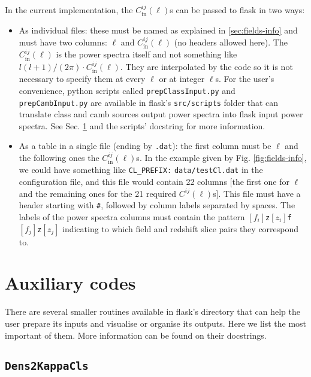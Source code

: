 \documentclass[12pt]{book} %
\newcommand{\nv}[1]{\mathrm{#1}}                 %
\begin{document}
In the current implementation, the $C_{\nv{in}}^{ij}(\ell)$s can be passed to {\sc flask} in two ways:
\begin{itemize}
\item As individual files: these must be named as explained in \ref{sec:fields-info} and must 
have two columns: $\ell$ and $C_{\nv{in}}^{ij}(\ell)$ (no headers allowed here). The $C_{\nv{in}}^{ij}(\ell)$ 
is the power spectra itself and not something like 
$l(l+1)/(2\pi)\cdot C_{\nv{in}}^{ij}(\ell)$. They are interpolated by the code so it is not necessary 
to specify them at every $\ell$ or at integer $\ell$s. For the user's convenience, {\sc python} 
scripts called {\tt prepClassInput.py} and {\tt prepCambInput.py} are available in {\sc flask}'s 
{\tt src/scripts} folder that can translate {\sc class} and {\sc camb sources} output power spectra 
into {\sc flask} input power spectra. See Sec. \ref{sec:aux} and the scripts' docstring for more information. 

\item As a table in a single file (ending by {\tt .dat}): the first column must be $\ell$ 
and the following ones the  $C_{\nv{in}}^{ij}(\ell)$s. In the example given by 
Fig. \ref{fig:fields-info}, we could have something like {\tt CL\_PREFIX:} 
{\tt data/testCl.dat} in the configuration file, and this file would contain 
22 columns [the first one for $\ell$ and the remaining ones for the 21 required 
$C^{ij}(\ell)$s]. This file must have a header starting with {\tt \#}, followed 
by column labels separated by spaces. The labels of the power spectra columns must 
contain the pattern $[f_i]${\tt z}$[z_i]${\tt f}$[f_j]${\tt z}$[z_j]$ indicating 
to which field and redshift slice pairs they correspond to.
\end{itemize}

\section{Auxiliary codes}
\label{sec:aux} 

There are several smaller routines available in {\sc flask}'s directory that can help the user prepare 
its inputs and visualise or organise its outputs. Here we list the most important of them. More information 
can be found on their docstrings. 

\subsection{{\tt Dens2KappaCls}}
\label{sec:dens2kappacls}
\end{document}
